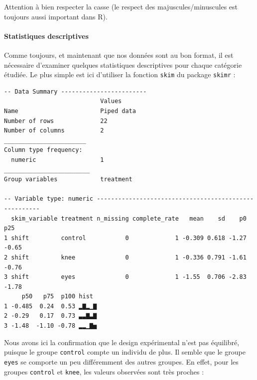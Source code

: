 \documentclass[
  a4paper,
]{article}
\newenvironment{Shaded}{\begin{snugshade}}{\end{snugshade}}
\newcommand{\KeywordTok}[1]{\textcolor[rgb]{0.12,0.11,0.11}{\textbf{#1}}}
\newcommand{\NormalTok}[1]{\textcolor[rgb]{0.12,0.11,0.11}{#1}}
\newcommand{\OperatorTok}[1]{\textcolor[rgb]{0.12,0.11,0.11}{#1}}
\newcommand{\StringTok}[1]{\textcolor[rgb]{0.75,0.01,0.01}{#1}}
\begin{document}
Attention à bien respecter la casse (le respect des majuscules/minuscules est toujours aussi important dans R).

\hypertarget{statistiques-descriptives-3}{%
\paragraph{Statistiques descriptives}\label{statistiques-descriptives-3}}

Comme toujours, et maintenant que nos données sont au bon format, il est nécessaire d'examiner quelques statistiques descriptives pour chaque catégorie étudiée. Le plus simple est ici d'utiliser la fonction \texttt{skim} du package \texttt{skimr} :

\begin{Shaded}
\end{Shaded}

\begin{verbatim}
-- Data Summary ------------------------
                           Values    
Name                       Piped data
Number of rows             22        
Number of columns          2         
_______________________              
Column type frequency:               
  numeric                  1         
________________________             
Group variables            treatment 

-- Variable type: numeric ------------------------------------------------------
  skim_variable treatment n_missing complete_rate   mean    sd    p0   p25
1 shift         control           0             1 -0.309 0.618 -1.27 -0.65
2 shift         knee              0             1 -0.336 0.791 -1.61 -0.76
3 shift         eyes              0             1 -1.55  0.706 -2.83 -1.78
     p50   p75  p100 hist 
1 -0.485  0.24  0.53 ▂▇▂▁▇
2 -0.29   0.17  0.73 ▃▃▇▃▇
3 -1.48  -1.10 -0.78 ▂▂▁▇▅
\end{verbatim}

Nous avons ici la confirmation que le design expérimental n'est pas équilibré, puisque le groupe \texttt{control} compte un individu de plus. Il semble que le groupe \texttt{eyes} se comporte un peu différemment des autres groupes. En effet, pour les groupes \texttt{control} et \texttt{knee}, les valeurs observées sont très proches :
\end{document}

